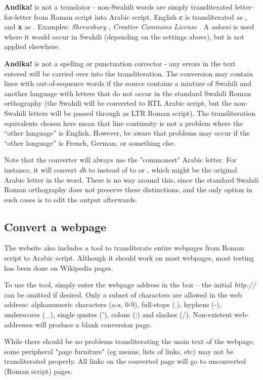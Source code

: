 \documentclass[a4paper,10pt, oneside]{book}
\newcommand\AS[1]{{\citationfont\RLE{#1}}}
\begin{document}
\textbf{Andika!} is not a translator - non-Swahili words are simply transliterated letter-for-letter from Roman script into Arabic script. English \textbf{c} is transliterated as \AS{ڮ}, and \textbf{x} as \AS{كْس}. Examples: \textit{Shrewsbury} \AS{شْرٖوسبُري}, \textit{Creative Commons License} \AS{ڮرٖئَتِيڤٖ ڮٗممٗنْس لِڮٖنْسٖ}. A \textit{sakani} is used where it would occur in Swahili (depending on the settings above), but is not applied elsewhere.

\textbf{Andika!} is not a spelling or punctuation corrector - any errors in the text entered will be carried over into the transliteration.
The conversion may contain lines with out-of-sequence words if the source contains a mixture of Swahili and another language with letters that do not occur in the standard Swahili Roman orthography (the Swahili will be converted to RTL Arabic script, but the non-Swahili letters will be passed through as LTR Roman script). The transliteration equivalents chosen here mean that line continuity is not a problem where the ``other language'' is English. However, be aware that problems may occur if the ``other language'' is French, German, or something else.

Note that the converter will always use the "commonest" Arabic letter. For instance, it will convert \textit{dh} to \AS{ذ} instead of to \AS{ض} or \AS{ظ}, which might be the original Arabic letter in the word. There is no way around this, since the standard Swahili Roman orthography does not preserve these distinctions, and the only option in such cases is to edit the output afterwards.

\subsection{Convert a webpage}

The website also includes a tool to transliterate entire webpages from Roman script to Arabic script.  Although it should work on most webpages, most testing has been done on Wikipedia pages.

To use the tool, simply enter the webpage address in the box -- the initial \textit{http://} can be omitted if desired.  Only a subset of characters are allowed in the web address: alphanumeric characters (a-z, 0-9), full-stops (.), hyphens (-), underscores (\_), single quotes ('), colons (:) and slashes (/).  Non-existent web-addresses will produce a blank conversion page.

While there should be no problems transliterating the main text of the webpage, some peripheral "page furniture" (eg menus, lists of links, etc) may not be transliterated properly.  All links on the converted page will go to unconverted (Roman script) pages. 
\end{document}
